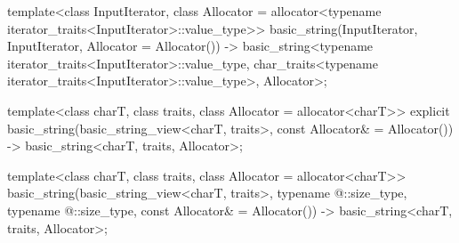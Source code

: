 \documentclass{wg21}
\begin{document}
\begin{codeblock}
{  template<class InputIterator,
           class Allocator = allocator<typename iterator_traits<InputIterator>::value_type>>
    basic_string(InputIterator, InputIterator, Allocator = Allocator())
      -> basic_string<typename iterator_traits<InputIterator>::value_type,
                      char_traits<typename iterator_traits<InputIterator>::value_type>,
                      Allocator>;

  template<class charT,
           class traits,
           class Allocator = allocator<charT>>
    explicit basic_string(basic_string_view<charT, traits>, const Allocator& = Allocator())
      -> basic_string<charT, traits, Allocator>;

  template<class charT,
           class traits,
           class Allocator = allocator<charT>>
    basic_string(basic_string_view<charT, traits>,
                 typename @\seebelow@::size_type, typename @\seebelow@::size_type,
                 const Allocator& = Allocator())
      -> basic_string<charT, traits, Allocator>;
}
\end{codeblock}
\end{document}
